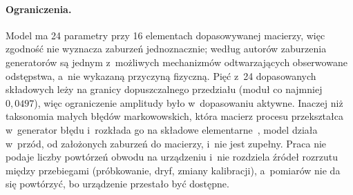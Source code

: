 \paragraph{Ograniczenia.}
Model ma 24 parametry przy 16 elementach dopasowywanej macierzy, więc zgodność nie wyznacza zaburzeń jednoznacznie; według autorów zaburzenia generatorów są jednym z~możliwych mechanizmów odtwarzających obserwowane odstępstwa, a~nie wykazaną przyczyną fizyczną.
Pięć z~24 dopasowanych składowych leży na granicy dopuszczalnego przedziału (moduł co najmniej $0{,}0497$), więc ograniczenie amplitudy było w~dopasowaniu aktywne.
Inaczej niż taksonomia małych błędów markowowskich, która macierz procesu przekształca w~generator błędu i~rozkłada go na składowe elementarne~\cite{blume-kohout_taxonomy_2022}, model działa w~przód, od założonych zaburzeń do macierzy, i~nie jest zupełny.
Praca nie podaje liczby powtórzeń obwodu na urządzeniu i~nie rozdziela źródeł rozrzutu między przebiegami (próbkowanie, dryf, zmiany kalibracji), a~pomiarów nie da się powtórzyć, bo urządzenie przestało być dostępne.


